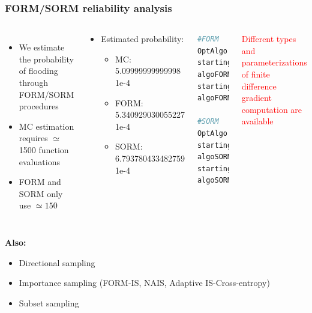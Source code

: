 \documentclass{beamer}
\begin{document}

\begin{frame}[containsverbatim]
\frametitle{FORM/SORM reliability analysis}

\scriptsize{

\begin{columns}

\begin{itemize}

\item We estimate the probability of flooding through FORM/SORM procedures

\vspace{10pt}

\item MC estimation requires $\simeq$ 1500 function evaluations 
\item FORM and SORM only use $\simeq 150$
\end{itemize}

\begin{block}{}
\begin{itemize}
\item Estimated probability:
\begin{itemize}
\tiny
\item MC: 5.09999999999998 1e-4
\item FORM: 5.340929030055227 1e-4
\item SORM: 6.793780433482759 1e-4
\end{itemize}
\end{itemize}
\end{block}

    
\tiny 
\begin{lstlisting}[language=Python, numbers = none]
#FORM
OptAlgo = ot.Cobyla()
startingPoint = Distribution.getMean()
algoFORM = ot.FORM(OptAlgo, eventF, 
startingPoint)
algoFORM.run()

#SORM
OptAlgo = ot.Cobyla()
startingPoint = Distribution.getMean()
algoSORM = ot.SORM(OptAlgo, eventF, 
startingPoint)
algoSORM.run()
\end{lstlisting}

\scriptsize

\vspace{20pt}

\textcolor{red}{Different types and parameterizations of finite difference gradient computation are available}

\end{columns}

\textbf{Also:}

\begin{itemize}
\item Directional sampling
\item Importance sampling (FORM-IS, NAIS, Adaptive IS-Cross-entropy)
\item Subset sampling
\end{itemize}
}

\end{frame}
\end{document}
